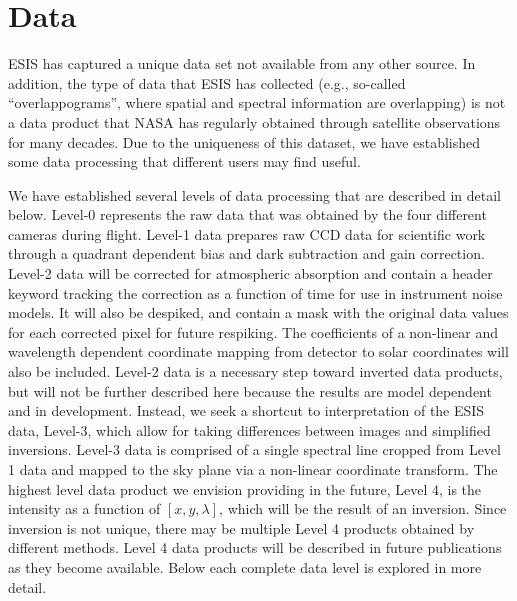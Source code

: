\section{Data} 

	ESIS has captured a unique data set not  available from any other source.  
	In addition, the type of data that ESIS has collected (e.g., so-called ``overlappograms'', where spatial and spectral information are overlapping) is not a data product that NASA has regularly obtained through satellite observations for many decades.  Due to the uniqueness of this dataset, we have established some data processing that different users may find useful.
	 
  
    We have established several levels of data processing that are described in detail below.
    Level-0 represents the raw data that was obtained by the four different cameras during flight.
    Level-1 data prepares raw CCD data for scientific work through a quadrant dependent bias and dark subtraction and gain correction. 
    Level-2 data will be corrected for atmospheric absorption and contain a header keyword tracking the correction as a function of time for use in instrument noise models.
    It will also be despiked, and contain a mask with the original data values for each corrected pixel for future respiking.
    The coefficients of a non-linear and wavelength dependent coordinate mapping from detector to solar coordinates will also be included. 
    Level-2 data is a necessary step toward inverted data products,  but will not be further described here because the results are model dependent and in development. 
    Instead, we seek a shortcut to interpretation of the ESIS data, Level-3, which allow for taking differences between images and simplified inversions.
    Level-3 data is comprised of a single spectral line cropped from Level 1 data and mapped to the sky plane via a non-linear coordinate transform.
    The highest level data product we envision providing in the future, Level 4, is the intensity as a function of $[x, y , \lambda]$, which will be the result of an inversion.
    Since inversion is not unique, there may be multiple Level 4 products obtained by different methods.  
    Level 4 data products will be described in future publications as they become available.  
    Below each complete data level is explored in more detail.
    
